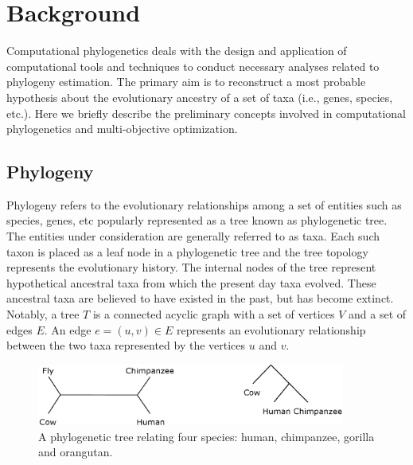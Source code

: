 \chapter{Background}
\label{ch:background}



\graphicspath{{snoga/}}
Computational phylogenetics deals with the design and application of computational tools and techniques to conduct necessary analyses related to phylogeny estimation. The primary aim is to reconstruct a most probable hypothesis about the evolutionary ancestry of a set of taxa (i.e., genes, species, etc.). Here we briefly describe the preliminary concepts involved in computational phylogenetics and multi-objective optimization. 

\section{Phylogeny}
Phylogeny refers to the evolutionary relationships among a set of entities such as species, genes, etc popularly represented as a tree known as phylogenetic tree. The entities under consideration are generally referred to as taxa. Each such taxon is placed as a leaf node in a phylogenetic tree and the tree topology represents the evolutionary history. The  internal nodes of the tree represent hypothetical ancestral taxa from which the present day taxa evolved. These ancestral taxa are believed to have existed in the past, but has become extinct. Notably, a tree $T$ is a connected acyclic graph with a set of vertices $V$ and a set of edges $E$. An edge $e = (u, v) \in E$ represents an evolutionary relationship between the two taxa represented by the vertices $u$ and $v$. 

\begin{figure}[!htbp]
\centering
\includegraphics[width=0.9\textwidth]{Figure/outgroup.eps}
\caption{A phylogenetic tree relating four species: human, chimpanzee, gorilla and orangutan. }
\label{fig:outgroup}
\end{figure}

